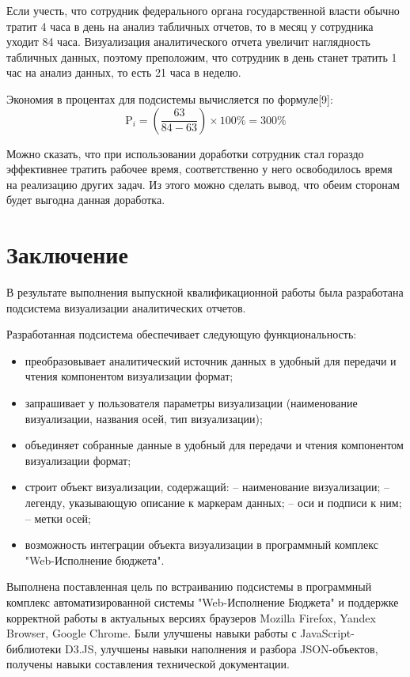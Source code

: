 \documentclass[a4paper]{extarticle}
\numberwithin{equation}{section}
\begin{document}
Если учесть, что сотрудник федерального органа государственной власти обычно тратит 4 часа в день на анализ табличных отчетов, то в месяц у сотрудника уходит 84 часа. Визуализация аналитического отчета увеличит наглядность табличных данных, поэтому преположим, что сотрудник в день станет тратить 1 час на анализ данных, то есть 21 часа в неделю.\par
Экономия в процентах для подсистемы вычисляется по формуле[9]:
\begin{equation}
\label{form22}
	\text{P}_i=(\frac{63}{84-63})\times 100\%=300\%
\end{equation}\par
Можно сказать, что при использовании доработки сотрудник стал гораздо эффективнее тратить рабочее время, соответственно у него освободилось время на реализацию других задач. Из этого можно сделать вывод, что обеим сторонам будет выгодна данная доработка.

\newpage
\section*{Заключение}
В результате выполнения выпускной квалификационной работы была разработана подсистема визуализации аналитических отчетов.\par
Разработанная подсистема обеспечивает следующую функциональность:\par
\begin{itemize}
  \item преобразовывает аналитический источник данных в удобный для передачи и чтения компонентом визуализации формат;
  \item запрашивает у пользователя параметры визуализации (наименование визуализации, названия осей, тип визуализации);
  \item объединяет собранные данные в удобный для передачи и чтения компонентом визуализации формат;
  \item строит объект визуализации, содержащий:\newline
    	\hspace*{2.5cm} – наименование визуализации;\newline
        \hspace*{2.5cm} – легенду, указывающую описание к маркерам данных;\newline
    	\hspace*{2.5cm} – оси и подписи к ним;\newline
        \hspace*{2.5cm} – метки осей;
  \item возможность интеграции объекта визуализации в программный комплекс "Web-Исполнение бюджета".
\end{itemize}\par
Выполнена поставленная цель по встраиванию подсистемы в программный комплекс автоматизированной системы "Web-Исполнение Бюджета" и поддержке корректной работы в актуальных версиях браузеров Mozilla Firefox, Yandex Browser, Google Chrome. Были улучшены навыки работы с JavaScript-библиотеки D3.JS, улучшены навыки наполнения и разбора JSON-объектов, получены навыки составления технической документации.
\end{document}
